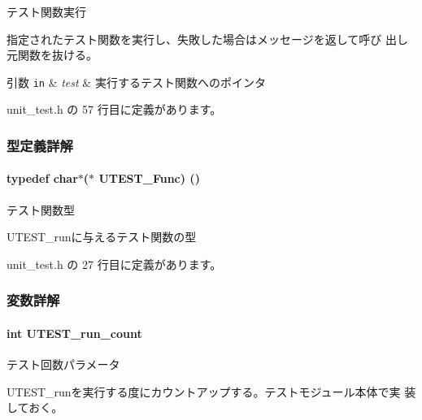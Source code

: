 テスト関数実行 

指定されたテスト関数を実行し、失敗した場合はメッセージを返して呼び 出し元関数を抜ける。


\begin{DoxyParams}[1]{引数}
\mbox{\tt in}  & {\em test} & 実行するテスト関数へのポインタ \\
\hline
\end{DoxyParams}


 unit\+\_\+test.\+h の 57 行目に定義があります。



\subsubsection{型定義詳解}
\paragraph[{U\+T\+E\+S\+T\+\_\+\+Func}]{\setlength{\rightskip}{0pt plus 5cm}typedef char$\ast$($\ast$ U\+T\+E\+S\+T\+\_\+\+Func) ()}\label{unit__test_8h_ab45728c52edb48f928e7c19aaaa52eec_ab45728c52edb48f928e7c19aaaa52eec}


テスト関数型 

U\+T\+E\+S\+T\+\_\+runに与えるテスト関数の型 

 unit\+\_\+test.\+h の 27 行目に定義があります。



\subsubsection{変数詳解}
\paragraph[{U\+T\+E\+S\+T\+\_\+run\+\_\+count}]{\setlength{\rightskip}{0pt plus 5cm}int U\+T\+E\+S\+T\+\_\+run\+\_\+count}\label{unit__test_8h_acd7569f2b3fd36e6f3b47850e36ccdb0_acd7569f2b3fd36e6f3b47850e36ccdb0}


テスト回数パラメータ 

U\+T\+E\+S\+T\+\_\+runを実行する度にカウントアップする。テストモジュール本体で実 装しておく。 